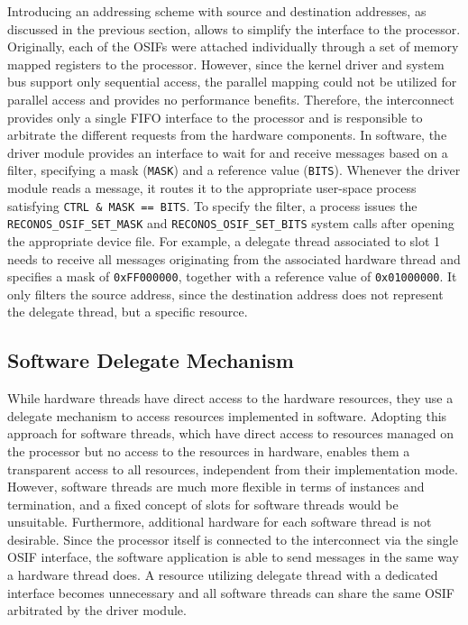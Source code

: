 Introducing an addressing scheme with source and destination addresses, as
discussed in the previous section, allows to simplify the interface to the
processor. Originally, each of the \acp{OSIF} were attached individually
through a set of memory mapped registers to the processor. However, since the
kernel driver and system bus support only sequential access, the parallel
mapping could not be utilized for parallel access and provides no performance
benefits. Therefore, the interconnect provides only a single \ac{FIFO}
interface to the processor and is responsible to arbitrate the different
requests from the hardware components. In software, the driver module provides
an interface to wait for and receive messages based on a filter, specifying a
mask (\lstinline{MASK}) and a reference value (\lstinline{BITS}). Whenever the
driver module reads a message, it routes it to the appropriate user-space
process satisfying \lstinline{CTRL & MASK == BITS}. To specify the filter, a
process issues the \lstinline{RECONOS_OSIF_SET_MASK} and
\lstinline{RECONOS_OSIF_SET_BITS} system calls after opening the appropriate
device file. For example, a delegate thread associated to slot 1 needs to
receive all messages originating from the associated hardware thread and
specifies a mask of \lstinline{0xFF000000}, together with a reference value of
\lstinline{0x01000000}. It only filters the source address, since the
destination address does not represent the delegate thread, but a specific
resource.

\subsection{Software Delegate Mechanism}

While hardware threads have direct access to the hardware resources, they use
a delegate mechanism to access resources implemented in software. Adopting
this approach for software threads, which have direct access to resources
managed on the processor but no access to the resources in hardware, enables
them a transparent access to all resources, independent from their
implementation mode. However, software threads are much more flexible in terms
of instances and termination, and a fixed concept of slots for software
threads would be unsuitable. Furthermore, additional hardware for each
software thread is not desirable. Since the processor itself is connected to
the interconnect via the single \ac{OSIF} interface, the software application
is able to send messages in the same way a hardware thread does. A resource
utilizing delegate thread with a dedicated interface becomes unnecessary and
all software threads can share the same \ac{OSIF} arbitrated by the driver
module.

